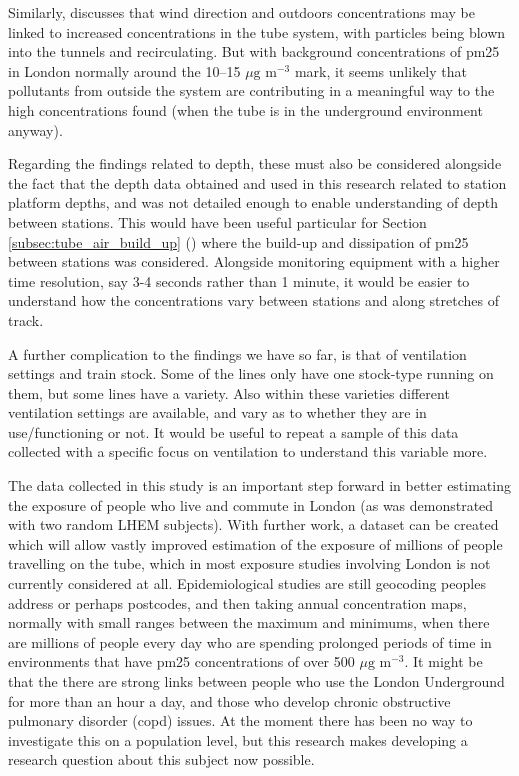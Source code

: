 Similarly, \cite{Adams2001a} discusses that wind direction and outdoors concentrations may be linked to increased concentrations in the tube system, with particles being blown into the tunnels and recirculating. But with background concentrations of \gls{pm25} in London normally around the 10--15 $\mu \text{g m}^{-3}$ mark, it seems unlikely that pollutants from outside the system are contributing in a meaningful way to the high concentrations found (when the tube is in the underground environment anyway). 

Regarding the findings related to depth, these must also be considered alongside the fact that the depth data obtained and used in this research related to station platform depths, and was not detailed enough to enable understanding of depth between stations. This would have been useful particular for Section \ref{subsec:tube_air_build_up} () where the build-up and dissipation of \gls{pm25} between stations was considered. Alongside monitoring equipment with a higher time resolution, say 3-4 seconds rather than 1 minute, it would be easier to understand how the concentrations vary between stations and along stretches of track.

A further complication to the findings we have so far, is that of ventilation settings and train stock. Some of the lines only have one stock-type running on them, but some lines have a variety. Also within these varieties different ventilation settings are available, and vary as to whether they are in use/functioning or not. It would be useful to repeat a sample of this data collected with a specific focus on ventilation to understand this variable more.

The data collected in this study is an important step forward in better estimating the exposure of people who live and commute in London (as was demonstrated with two random LHEM subjects). With further work, a dataset can be created which will allow vastly improved estimation of the exposure of millions of people travelling on the tube, which in most exposure studies involving London is not currently considered at all. Epidemiological studies are still geocoding peoples address or perhaps postcodes, and then taking annual concentration maps, normally with small ranges between the maximum and minimums, when there are millions of people every day who are spending prolonged periods of time in environments that have \gls{pm25} concentrations of over 500 $\mu \text{g m}^{-3}$. It might be that the there are strong links between people who use the London Underground for more than an hour a day, and those who develop chronic obstructive pulmonary disorder (\gls{copd}) issues. At the moment there has been no way to investigate this on a population level, but this research makes developing a research question about this subject now possible.


